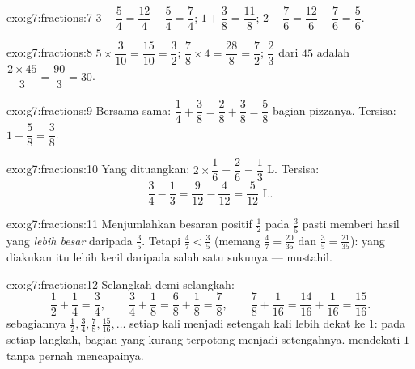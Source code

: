 \begin{solution}{exo:g7:fractions:7}
$3 - \dfrac54 = \dfrac{12}{4} - \dfrac54 = \dfrac74$; \quad
$1 + \dfrac38 = \dfrac{11}{8}$; \quad
$2 - \dfrac76 = \dfrac{12}{6} - \dfrac76 = \dfrac56$.
\end{solution}

\begin{solution}{exo:g7:fractions:8}
$5 \times \dfrac{3}{10} = \dfrac{15}{10} = \dfrac32$; \quad
$\dfrac78 \times 4 = \dfrac{28}{8} = \dfrac72$; \quad
$\dfrac23$ dari $45$ adalah $\dfrac{2 \times 45}{3} = \dfrac{90}{3} = 30$.
\end{solution}

\begin{solution}{exo:g7:fractions:9}
Bersama-sama: $\dfrac14 + \dfrac38 = \dfrac28 + \dfrac38 = \dfrac58$
bagian pizzanya. Tersisa: $1 - \dfrac58 = \dfrac38$.
\end{solution}

\begin{solution}{exo:g7:fractions:10}
Yang dituangkan: $2 \times \dfrac16 = \dfrac26 = \dfrac13$ L. Tersisa:
\[
\frac34 - \frac13 = \frac{9}{12} - \frac{4}{12} = \frac{5}{12}
\text{ L}.
\]
\end{solution}

\begin{solution}{exo:g7:fractions:11}
Menjumlahkan besaran positif $\frac12$ pada $\frac35$ pasti memberi
hasil yang \emph{lebih besar} daripada $\frac35$. Tetapi
$\frac47 < \frac35$ (memang $\frac47 = \frac{20}{35}$ dan
$\frac35 = \frac{21}{35}$):  yang diakukan itu lebih kecil
daripada salah satu sukunya --- mustahil.
\end{solution}

\begin{solution}{exo:g7:fractions:12}
Selangkah demi selangkah:
\[
\frac12 + \frac14 = \frac34, \qquad
\frac34 + \frac18 = \frac68 + \frac18 = \frac78, \qquad
\frac78 + \frac1{16} = \frac{14}{16} + \frac1{16} = \frac{15}{16}.
\]
 sebagiannya $\frac12, \frac34, \frac78, \frac{15}{16}, \dots$
setiap kali menjadi setengah kali lebih dekat ke $1$: pada setiap
langkah, bagian yang kurang terpotong menjadi setengahnya. 
mendekati $1$ tanpa pernah mencapainya.
\end{solution}

